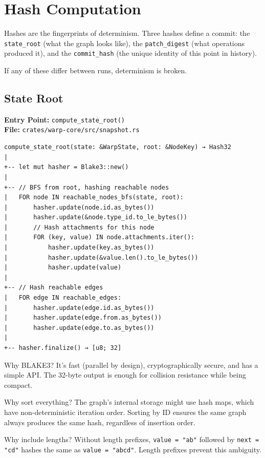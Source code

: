 
\chapter{Hash Computation}
\label{chap:tour-hashing}

\begin{bigpicture}
Hashes are the fingerprints of determinism. Three hashes define a commit: the \texttt{state\_root} (what the graph looks like), the \texttt{patch\_digest} (what operations produced it), and the \texttt{commit\_hash} (the unique identity of this point in history).

If any of these differ between runs, determinism is broken.
\end{bigpicture}

\section{State Root}

\textbf{Entry Point:} \texttt{compute\_state\_root()} \\
\textbf{File:} \texttt{crates/warp-core/src/snapshot.rs}

\begin{verbatim}
compute_state_root(state: &WarpState, root: &NodeKey) → Hash32
|
+-- let mut hasher = Blake3::new()
|
+-- // BFS from root, hashing reachable nodes
|   FOR node IN reachable_nodes_bfs(state, root):
|       hasher.update(node.id.as_bytes())
|       hasher.update(&node.type_id.to_le_bytes())
|       // Hash attachments for this node
|       FOR (key, value) IN node.attachments.iter():
|           hasher.update(key.as_bytes())
|           hasher.update(&value.len().to_le_bytes())
|           hasher.update(value)
|
+-- // Hash reachable edges
|   FOR edge IN reachable_edges:
|       hasher.update(edge.id.as_bytes())
|       hasher.update(edge.from.as_bytes())
|       hasher.update(edge.to.as_bytes())
|
+-- hasher.finalize() → [u8; 32]
\end{verbatim}

\begin{commentary}
Why BLAKE3? It's fast (parallel by design), cryptographically secure, and has a simple API. The 32-byte output is enough for collision resistance while being compact.

Why sort everything? The graph's internal storage might use hash maps, which have non-deterministic iteration order. Sorting by ID ensures the same graph always produces the same hash, regardless of insertion order.

Why include lengths? Without length prefixes, \texttt{value = "ab"} followed by \texttt{next = "cd"} hashes the same as \texttt{value = "abcd"}. Length prefixes prevent this ambiguity.
\end{commentary}


